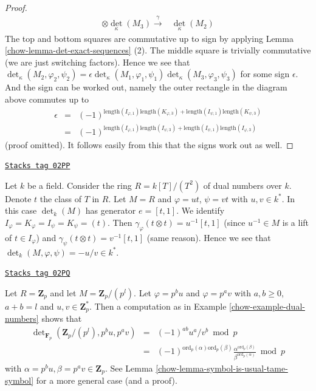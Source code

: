 \begin{proof}
$$\begin{array}{cc}
\otimes
\det_\kappa(M_3) \overset{\gamma}{\longrightarrow} & \det_\kappa(M_2)\end{array}
$$
The top and bottom squares are commutative up to sign
by applying Lemma \ref{chow-lemma-det-exact-sequences} (2).
The middle square is trivially
commutative (we are just switching factors). Hence we see
that
$\det\nolimits_\kappa(M_2, \varphi_2, \psi_2) =
\epsilon \det\nolimits_\kappa(M_1, \varphi_1, \psi_1)
\det\nolimits_\kappa(M_3, \varphi_3, \psi_3)
$
for some sign $\epsilon$. And the sign can be worked out, namely
the outer rectangle in the diagram above commutes up to
\begin{eqnarray*}
\epsilon & = &
(-1)^{\text{length}(I_{\varphi, 1})\text{length}(K_{\varphi, 3})
+ \text{length}(I_{\psi, 1})\text{length}(K_{\psi, 3})} \\
& = &
(-1)^{\text{length}(I_{\varphi, 1})\text{length}(I_{\psi, 3})
+ \text{length}(I_{\psi, 1})\text{length}(I_{\varphi, 3})}
\end{eqnarray*}
(proof omitted). It follows easily from this that the signs
work out as well.
\end{proof}

\begin{example}
\label{chow-example-dual-numbers}
\href{https://stacks.math.columbia.edu/tag/02PP}{\texttt{Stacks tag 02PP}}

Let $k$ be a field.
Consider the ring $R = k[T]/(T^2)$ of dual numbers over $k$.
Denote $t$ the class of $T$ in $R$.
Let $M = R$ and $\varphi = ut$, $\psi = vt$ with $u, v \in k^*$.
In this case $\det_k(M)$ has generator $e = [t, 1]$.
We identify $I_\varphi = K_\varphi = I_\psi = K_\psi = (t)$.
Then $\gamma_\varphi(t \otimes t) = u^{-1}[t, 1]$
(since $u^{-1} \in M$ is a lift of $t \in I_\varphi$)
and $\gamma_\psi(t \otimes t) = v^{-1}[t, 1]$ (same reason).
Hence we see that $\det_k(M, \varphi, \psi) = -u/v \in k^*$.
\end{example}

\begin{example}[Zp]
\label{chow-example-Zp}
\href{https://stacks.math.columbia.edu/tag/02PQ}{\texttt{Stacks tag 02PQ}}

Let $R = \mathbf{Z}_p$ and let $M = \mathbf{Z}_p/(p^l)$.
Let $\varphi = p^b u$ and $\varphi = p^a v$ with $a, b \geq 0$,
$a + b = l$ and $u, v \in \mathbf{Z}_p^*$.
Then a computation as in Example \ref{chow-example-dual-numbers}
shows that
\begin{eqnarray*}
\det\nolimits_{\mathbf{F}_p}(\mathbf{Z}_p/(p^l), p^bu, p^av) & = &
(-1)^{ab}u^a/v^b \bmod p \\
& = &
(-1)^{\text{ord}_p(\alpha)\text{ord}_p(\beta)}
\frac{\alpha^{\text{ord}_p(\beta)}}{\beta^{\text{ord}_p(\alpha)}} \bmod p
\end{eqnarray*}
with $\alpha = p^bu, \beta = p^av \in \mathbf{Z}_p$.
See Lemma \ref{chow-lemma-symbol-is-usual-tame-symbol}
for a more general case (and a proof).
\end{example}

